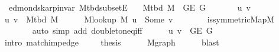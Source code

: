 \begin{isabellebody}
%
\endisadeliminvisible
%
\isataginvisible
{}\isamarkupfalse%
%
\endisataginvisible
{\isafoldinvisible}%
%
\isadeliminvisible
\isanewline
%
\endisadeliminvisible
\isanewline
{}\isamarkupfalse%
\ {\isacharparenleft}{\kern0pt}\ edmonds{\isacharunderscore}{\kern0pt}karp{\isacharunderscore}{\kern0pt}invar{\isacharparenright}{\kern0pt}\ M{\isacharunderscore}{\kern0pt}tbd{\isacharunderscore}{\kern0pt}subset{\isacharunderscore}{\kern0pt}E{\isacharcolon}{\kern0pt}\isanewline
\ \ \ {\isachardoublequoteopen}M{\isacharunderscore}{\kern0pt}tbd\ M\ {\isasymsubseteq}\ G{\isachardot}{\kern0pt}E\ G{\isachardoublequoteclose}\isanewline
%
\isadelimproof
%
\endisadelimproof
%
\isatagproof
{}\isamarkupfalse%
\ {\isacharminus}{\kern0pt}\isanewline
\ \ \isacommand{{\isacharbraceleft}{\kern0pt}}\isamarkupfalse%
\ \isamarkupfalse%
\ u\ v\isanewline
\ \ \ \ \isamarkupfalse%
\ {\isachardoublequoteopen}{\isacharbraceleft}{\kern0pt}u{\isacharcomma}{\kern0pt}\ v{\isacharbraceright}{\kern0pt}\ {\isasymin}\ M{\isacharunderscore}{\kern0pt}tbd\ M{\isachardoublequoteclose}\isanewline
\ \ \ \ \isamarkupfalse%
\ {\isachardoublequoteopen}M{\isacharunderscore}{\kern0pt}lookup\ M\ u\ {\isacharequal}{\kern0pt}\ Some\ v{\isachardoublequoteclose}\isanewline
\ \ \ \ \ \ \isamarkupfalse%
\ is{\isacharunderscore}{\kern0pt}symmetric{\isacharunderscore}{\kern0pt}Map{\isacharunderscore}{\kern0pt}M\isanewline
\ \ \ \ \ \ \isamarkupfalse%
\ {\isacharparenleft}{\kern0pt}auto\ simp\ add{\isacharcolon}{\kern0pt}\ doubleton{\isacharunderscore}{\kern0pt}eq{\isacharunderscore}{\kern0pt}iff{\isacharparenright}{\kern0pt}\isanewline
\ \ \ \ \isamarkupfalse%
\ {\isachardoublequoteopen}{\isacharbraceleft}{\kern0pt}u{\isacharcomma}{\kern0pt}\ v{\isacharbraceright}{\kern0pt}\ {\isasymin}\ G{\isachardot}{\kern0pt}E\ G{\isachardoublequoteclose}\isanewline
\ \ \ \ \ \ \isamarkupfalse%
\ {\isacharparenleft}{\kern0pt}intro\ match{\isacharunderscore}{\kern0pt}imp{\isacharunderscore}{\kern0pt}edge{\isacharparenright}{\kern0pt}\ \isacommand{{\isacharbraceright}{\kern0pt}}\isamarkupfalse%
\isanewline
\ \ \isamarkupfalse%
\ {\isacharquery}{\kern0pt}thesis\isanewline
\ \ \ \ \isamarkupfalse%
\ M{\isachardot}{\kern0pt}graph\isanewline
\ \ \ \ \isamarkupfalse%
\ blast\isanewline
{}\isamarkupfalse%
%
\endisatagproof
{\isafoldproof}%
%
\isadelimproof
%
\endisadelimproof
%
\begin{isamarkuptext}%

\end{isamarkuptext}
\end{isabellebody}

